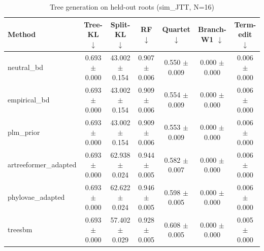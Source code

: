 \begin{table}[t]\centering
\caption{Tree generation on held-out roots (sim_JTT, N=16)}
\begin{tabular}{lcccccc}
\toprule
Method & Tree-KL $\downarrow$ & Split-KL $\downarrow$ & RF $\downarrow$ & Quartet $\downarrow$ & Branch-W1 $\downarrow$ & Term-edit $\downarrow$ \\
\midrule
neutral\_bd & 0.693 $\pm$ 0.000 & 43.002 $\pm$ 0.154 & 0.907 $\pm$ 0.006 & 0.550 $\pm$ 0.009 & 0.000 $\pm$ 0.000 & 0.006 $\pm$ 0.000 \\
empirical\_bd & 0.693 $\pm$ 0.000 & 43.002 $\pm$ 0.154 & 0.909 $\pm$ 0.006 & 0.554 $\pm$ 0.009 & 0.000 $\pm$ 0.000 & 0.006 $\pm$ 0.000 \\
plm\_prior & 0.693 $\pm$ 0.000 & 43.002 $\pm$ 0.154 & 0.909 $\pm$ 0.006 & 0.553 $\pm$ 0.009 & 0.000 $\pm$ 0.000 & 0.006 $\pm$ 0.000 \\
artreeformer\_adapted & 0.693 $\pm$ 0.000 & 62.938 $\pm$ 0.024 & 0.944 $\pm$ 0.005 & 0.582 $\pm$ 0.007 & 0.000 $\pm$ 0.000 & 0.006 $\pm$ 0.000 \\
phylovae\_adapted & 0.693 $\pm$ 0.000 & 62.622 $\pm$ 0.024 & 0.946 $\pm$ 0.005 & 0.598 $\pm$ 0.005 & 0.000 $\pm$ 0.000 & 0.006 $\pm$ 0.000 \\
treesbm & 0.693 $\pm$ 0.000 & 57.402 $\pm$ 0.029 & 0.928 $\pm$ 0.005 & 0.608 $\pm$ 0.005 & 0.000 $\pm$ 0.000 & 0.005 $\pm$ 0.000 \\
\bottomrule
\end{tabular}
\end{table}